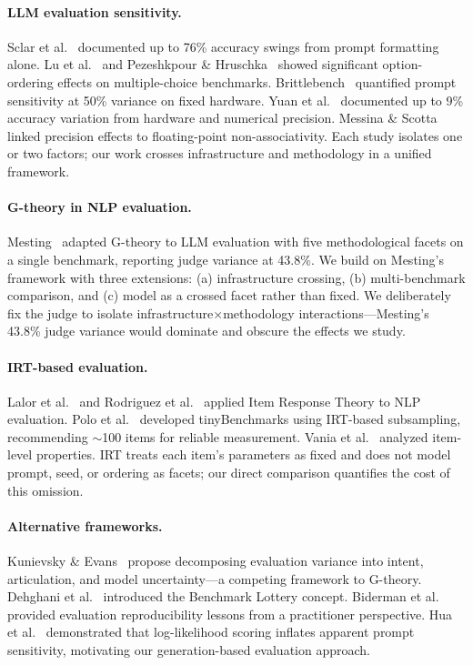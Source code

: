 \documentclass[11pt,a4paper]{article}
\begin{document}
\paragraph{LLM evaluation sensitivity.}
Sclar et al.~\citeyearpar{sclar2024} documented up to 76\% accuracy swings from prompt formatting alone.
Lu et al.~\citeyearpar{lu2022} and Pezeshkpour \& Hruschka~\citeyearpar{pezeshkpour2024} showed significant option-ordering effects on multiple-choice benchmarks.
Brittlebench~\citeyearpar{brittlebench2026} quantified prompt sensitivity at 50\% variance on fixed hardware.
Yuan et al.~\citeyearpar{yuan2025} documented up to 9\% accuracy variation from hardware and numerical precision.
Messina \& Scotta~\citeyearpar{messina2026} linked precision effects to floating-point non-associativity.
Each study isolates one or two factors; our work crosses infrastructure and methodology in a unified framework.

\paragraph{G-theory in NLP evaluation.}
Mesting~\citeyearpar{mesting2026} adapted G-theory to LLM evaluation with five methodological facets on a single benchmark, reporting judge variance at 43.8\%.
We build on Mesting's framework with three extensions: (a) infrastructure crossing, (b) multi-benchmark comparison, and (c) model as a crossed facet rather than fixed.
We deliberately fix the judge to isolate infrastructure$\times$methodology interactions---Mesting's 43.8\% judge variance would dominate and obscure the effects we study.

\paragraph{IRT-based evaluation.}
Lalor et al.~\citeyearpar{lalor2019} and Rodriguez et al.~\citeyearpar{rodriguez2021} applied Item Response Theory to NLP evaluation.
Polo et al.~\citeyearpar{polo2024} developed tinyBenchmarks using IRT-based subsampling, recommending $\sim$100 items for reliable measurement.
Vania et al.~\citeyearpar{vania2021} analyzed item-level properties.
IRT treats each item's parameters as fixed and does not model prompt, seed, or ordering as facets; our direct comparison quantifies the cost of this omission.

\paragraph{Alternative frameworks.}
Kunievsky \& Evans~\citeyearpar{kunievsky2025} propose decomposing evaluation variance into intent, articulation, and model uncertainty---a competing framework to G-theory.
Dehghani et al.~\citeyearpar{dehghani2021} introduced the Benchmark Lottery concept.
Biderman et al.~\citeyearpar{biderman2024} provided evaluation reproducibility lessons from a practitioner perspective.
Hua et al.~\citeyearpar{hua2025} demonstrated that log-likelihood scoring inflates apparent prompt sensitivity, motivating our generation-based evaluation approach.
\end{document}
